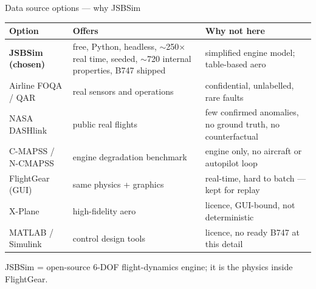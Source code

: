 \documentclass[aspectratio=169,11pt]{beamer}
\newcommand{\aside}[1]{{\color{muted}\small #1}}
\begin{document}
\begin{frame}{Data source options --- why JSBSim}
  \footnotesize
  \begin{tabularx}{\textwidth}{@{}l L L@{}}
    \toprule
    Option & Offers & Why not here \\
    \midrule
    \textbf{JSBSim (chosen)} & free, Python, headless, $\sim$250$\times$ real time, seeded, $\sim$720 internal properties, B747 shipped & simplified engine model; table-based aero \\
    Airline FOQA / QAR & real sensors and operations & confidential, unlabelled, rare faults \\
    NASA DASHlink & public real flights & few confirmed anomalies, no ground truth, no counterfactual \\
    C-MAPSS / N-CMAPSS & engine degradation benchmark & engine only, no aircraft or autopilot loop \\
    FlightGear (GUI) & same physics + graphics & real-time, hard to batch --- kept for replay \\
    X-Plane & high-fidelity aero & licence, GUI-bound, not deterministic \\
    MATLAB / Simulink & control design tools & licence, no ready B747 at this detail \\
    \bottomrule
  \end{tabularx}
  \vspace{0.6em}
  \aside{JSBSim = open-source 6-DOF flight-dynamics engine; it is the physics inside FlightGear.}
\end{frame}
\end{document}
